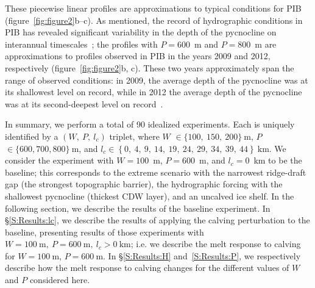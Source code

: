 \documentclass[draft]{agujournal2019}
\begin{document}
These piecewise linear profiles are approximations to typical conditions for PIB \cite{Jacobs1996GRL, Dutrieux2014Science, Jenkins2018NatureGeo} (figure~\ref{fig:figure2}b--c). As mentioned, the record of hydrographic conditions in PIB has revealed significant variability in the depth of the pycnocline on interannual timescales~\cite{Dutrieux2014Science}; the profiles with $P=600$~m and $P=800$~m are approximations to profiles observed in PIB in the years 2009 and 2012, respectively (figure~\ref{fig:figure2}b, c). These two years approximately span the range of observed conditions: in 2009, the average depth of the pycnocline was at its shallowest level on record, while in 2012 the average depth of the pycnocline was at its second-deepest level on record~\cite{Webber2017NatureComms}.

In summary, we perform a total of 90 idealized experiments. Each is uniquely identified by a $(W,~P,~l_c)$ triplet, where $W$ $\in \{100,~150,~200\}~\text{m}$, $P$ $\in \{600, 700, 800\}~\text{m}$, and $l_c \in \left\{0,~4,~9,~14,~19,~24,~29,~34,~39,~44\right\}~\text{km}$. We consider the experiment with $W=100$~m, $P=600$~m, and $l_c=0$~km to be the baseline; this corresponds to the extreme scenario with the narrowest ridge-draft gap (the strongest topographic barrier), the hydrographic forcing with the shallowest pycnocline (thickest CDW layer), and an uncalved ice shelf. In the following section, we describe the results of the baseline experiment. In \S\ref{S:Results:lc}, we describe the results of applying the calving perturbation to the baseline, presenting results of those experiments with  $W=100~\text{m},~P=600~\text{m},~l_c>0~\text{km}$; i.e. we describe the melt response to calving for $W=100~\text{m}$, $P = 600~\text{m}$. In \S\ref{S:Results:H} and~\ref{S:Results:P}, we respectively describe how the melt response to calving changes for the different values of $W$ and $P$ considered here.
\end{document}

